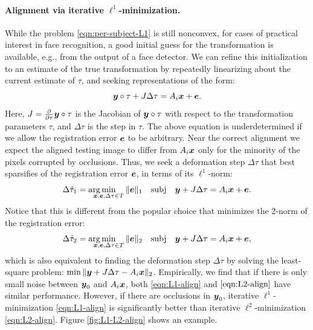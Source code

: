 \paragraph{Alignment via iterative $\ell^1$-minimization.} While the problem \eqref{eqn:per-subject-L1} is still nonconvex, for cases of practical interest in face recognition, a good initial guess for the transformation is available, e.g., from the output of a face detector. We can refine this initialization to an estimate of the true transformation by repeatedly linearizing about  the current estimate of $\tau$, and seeking representations of the form:\vspace{0mm}
\begin{equation}
\y\circ \tau + J \Delta \tau = A_i \x + \e.\vspace{0mm}
\end{equation}
Here, $J = \frac{\partial}{\partial \tau} {\boldsymbol{y}} \circ \tau$ is the Jacobian of ${\boldsymbol{y}} \circ \tau$ with respect to the transformation parameters $\tau$, and $\Delta \tau$ is the step in $\tau$. The above equation is underdetermined if we allow the registration error $\boldsymbol{e}$ to be arbitrary. Near the correct alignment we expect the aligned testing image to differ from $A_i {\boldsymbol{x}}$ only for the minority of the pixels corrupted by occlusions. Thus, we seek a deformation step $\Delta \tau$ that best sparsifies of the registration error $\boldsymbol{e}$, in terms of its $\ell^1$-norm: \vspace{0mm}
\begin{equation}
\Delta\hat{\tau}_1 = \arg\hspace{-3.5mm}\min_{\x,\e,\Delta\tau \in T} \| \e \|_1 \quad \subj \quad \y + J \Delta \tau = A_i \x + \e.\vspace{0mm}
\label{eqn:L1-align}
\end{equation}
Notice that this is different from the popular choice that minimizes the 2-norm of the registration error:\vspace{0mm}
\begin{equation}
\Delta\hat{\tau}_2 = \arg\hspace{-3.5mm}\min_{\x,\e,\Delta\tau \in T} \| \e \|_2 \quad \subj \quad \y + J \Delta \tau = A_i \x + \e,\vspace{0mm}
\label{eqn:L2-align}
\end{equation}
which is also equivalent to finding the deformation step $\Delta  \tau$ by solving the least-square problem: $\min \|{\boldsymbol{y}} + J\Delta \tau - A_i {\boldsymbol{x}} \|_2$. Empirically, we find that if there is only small noise between ${\boldsymbol{y}}_0$ and $A_i{\boldsymbol{x}}$, both \eqref{eqn:L1-align} and $\eqref{eqn:L2-align}$ have similar performance.  However, if there are occlusions in ${\boldsymbol{y}}_0$, iterative $\ell^1$-minimization \eqref{eqn:L1-align} is significantly better than iterative $\ell^2$-minimization \eqref{eqn:L2-align}. Figure \ref{fig:L1-L2-align} shows an example.
